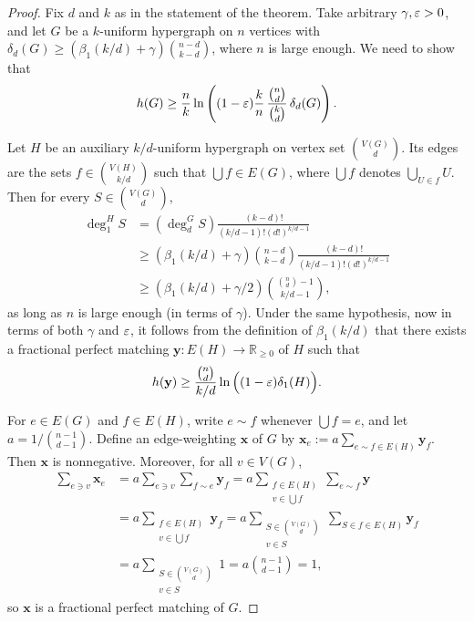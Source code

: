 \documentclass[10pt,a4paper]{amsart}
\newcommand{\R}{\mathbb{R}}
\newcommand{\Rpos}{\R_{\ge0}}
\renewcommand{\epsilon}{\ensuremath\varepsilon}
\newcommand{\fpm}{\mathbf{x}}
\newcommand{\fpmy}{\mathbf{y}}
\begin{document}
\begin{proof}
    Fix $d$ and $k$ as in the statement of the theorem. Take arbitrary $\gamma,\epsilon>0$, and let $G$ be a $k$-uniform hypergraph on $n$ vertices with $\delta_d(G)\ge(\beta_1(k/d)+\gamma)\binom{n-d}{k-d}$, where $n$ is large enough. We need to show that
    $$h(G)\ge \frac{n}{k}\ln\left((1-\epsilon)\frac{k}{n}\,\frac{\binom{n}{d}}{\binom{k}{d}}\,\delta_d(G)\right).$$
    
    Let $H$ be an auxiliary $k/d$-uniform hypergraph on vertex set $\binom{V(G)}{d}$. Its edges are the sets $f\in\binom{V(H)}{k/d}$ such that $\bigcup f\in E(G)$, where $\bigcup f$ denotes $\bigcup_{U\in f} U$. Then for every $S\in \binom{V(G)}{d}$,
    \begin{align*}
        \deg^H_1S &=\left(\deg_d^GS\right)\frac{(k-d)!}{(k/d-1)!(d!)^{k/d-1}} \\
        &\ge (\beta_1(k/d)+\gamma)\binom{n-d}{k-d}\frac{(k-d)!}{(k/d-1)!(d!)^{k/d-1}} \\
        &\ge (\beta_1(k/d)+\gamma/2)\binom{\binom{n}{d}-1}{k/d-1},
    \end{align*}
    as long as $n$ is large enough (in terms of $\gamma$). Under the same hypothesis, now in terms of both $\gamma$ and $\epsilon$, it follows from the definition of $\beta_1(k/d)$ that there exists a fractional perfect matching $\fpmy:E(H)\to\Rpos$ of $H$ such that
    \begin{equation}\label{eq-ent-div}
        h(\fpmy)\ge \frac{\binom{n}{d}}{k/d}\ln\Big((1-\epsilon)\delta_1(H)\Big).
    \end{equation}

    For $e\in E(G)$ and $f\in E(H)$, write $e\sim f$ whenever $\bigcup f=e$, and let $a=1/\binom{n-1}{d-1}$. Define an edge-weighting $\fpm$ of $G$ by $\fpm_e:= a\sum_{e\sim f\in E(H)} \fpmy_f$. Then $\fpm$ is nonnegative. Moreover, for all $v\in V(G)$,
    \begin{align*}
        \sum_{e\ni v}\fpm_e &= a\sum_{e\ni v}\sum_{f\sim e} \fpmy_f = a\sum_{\substack{f\in E(H) \\ v\in\bigcup f}}\sum_{e\sim f}\fpmy \\
        &= a\sum_{\substack{f\in E(H) \\ v\in\bigcup f}}\fpmy_f = a\sum_{\substack{S\in\binom{V(G)}{d} \\ v\in S}} \sum_{S\in f\in E(H)} \fpmy_f \\
        &= a\sum_{\substack{S\in\binom{V(G)}{d} \\ v\in S}}1 = a\binom{n-1}{d-1} = 1,
    \end{align*}
    so $\fpm$ is a fractional perfect matching of $G$.
    

\end{proof}
\end{document}
